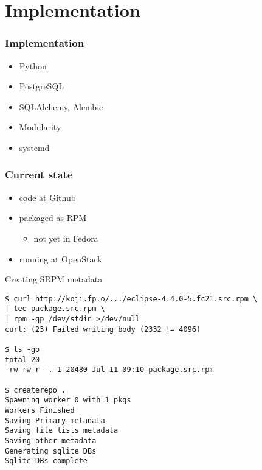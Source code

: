 \documentclass[pdftex,unicode,xcolor=table]{beamer}
\begin{document}
\section{Implementation}
\begin{frame}
  \frametitle{Implementation}
  \begin{itemize}
    \item Python
    \item PostgreSQL
    \item SQLAlchemy, Alembic
    \item Modularity
    \item systemd
  \end{itemize}
\end{frame}

\begin{frame}
  \frametitle{Current state}
  \begin{itemize}
    \item code at Github
    \item packaged as RPM
    \begin{itemize}
      \item not yet in Fedora
    \end{itemize}
    \item running at OpenStack
  \end{itemize}
\end{frame}

\small
\begin{frame}[fragile]
\begin{block}{Creating SRPM metadata}
\begin{verbatim}
$ curl http://koji.fp.o/.../eclipse-4.4.0-5.fc21.src.rpm \
| tee package.src.rpm \
| rpm -qp /dev/stdin >/dev/null
curl: (23) Failed writing body (2332 != 4096)

$ ls -go
total 20
-rw-rw-r--. 1 20480 Jul 11 09:10 package.src.rpm

$ createrepo .
Spawning worker 0 with 1 pkgs
Workers Finished
Saving Primary metadata
Saving file lists metadata
Saving other metadata
Generating sqlite DBs
Sqlite DBs complete
\end{verbatim}
\end{block}
\end{frame}
\end{document}
